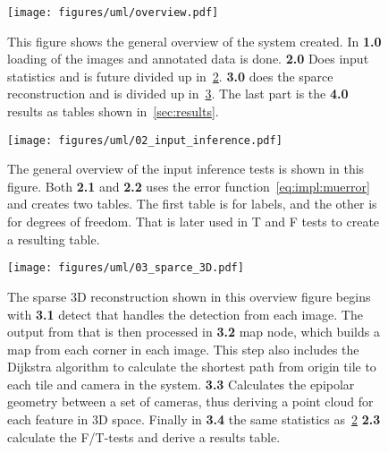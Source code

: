 \begin{figure}
\begin{center}
    \texttt{[image: figures/uml/overview.pdf]}
\end{center}
\caption{This figure shows the general overview of the system created. In \textbf{1.0} loading of the images and annotated data is done.
    \textbf{2.0} Does input statistics and is future divided up in~\ref{fig:method:inference}. \textbf{3.0} does the sparce reconstruction and is divided up in~\ref{fig:method:sparce3d}.
The last part is the \textbf{4.0} results as tables shown in~\ref{sec:results}.}\label{fig:method:overview}
\end{figure}

\begin{figure}
\begin{center}
    \texttt{[image: figures/uml/02\_input\_inference.pdf]}
\end{center}
\caption{The general overview of the input inference tests is shown in this figure.
    Both \textbf{2.1} and \textbf{2.2} uses the error function~\ref{eq:impl:muerror} and creates two tables. The first table is for labels, and the other is for degrees of freedom. That is later used in T and F tests to create a resulting table.
}
\label{fig:method:inference}
\end{figure}


\begin{figure}
    \begin{center}
        \texttt{[image: figures/uml/03\_sparce\_3D.pdf]}
    \end{center}
    \caption{The sparse 3D reconstruction shown in this overview figure begins with \textbf{3.1} detect that handles the \aruco{ } detection from each image.
        The output from that is then processed in \textbf{3.2} map node, which builds a map from each corner in each image. This step also includes the Dijkstra algorithm to calculate the shortest path from \aruco{ } origin tile to each tile and camera in the system.
        \textbf{3.3} Calculates the epipolar geometry between a set of cameras, thus deriving a point cloud for each feature in 3D space.
        Finally in \textbf{3.4} the same statistics as~\ref{fig:method:inference} \textbf{2.3} calculate the F/T-tests and derive a results table.
    }\label{fig:method:sparce3d}
\end{figure}





